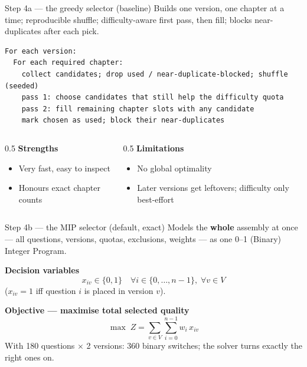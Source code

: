\documentclass[11pt,aspectratio=169]{beamer}
\begin{document}
\begin{frame}[fragile]{Step 4a — the greedy selector (baseline)}
  Builds one version, one chapter at a time; reproducible shuffle; difficulty-aware
  first pass, then fill; blocks near-duplicates after each pick.
\begin{lstlisting}
For each version:
  For each required chapter:
    collect candidates; drop used / near-duplicate-blocked; shuffle (seeded)
    pass 1: choose candidates that still help the difficulty quota
    pass 2: fill remaining chapter slots with any candidate
    mark chosen as used; block their near-duplicates
\end{lstlisting}
  \begin{columns}[T]
    \begin{column}{0.5\textwidth}
      \footnotesize\textbf{Strengths}
      \begin{itemize}
        \item Very fast, easy to inspect
        \item Honours exact chapter counts
      \end{itemize}
    \end{column}
    \begin{column}{0.5\textwidth}
      \footnotesize\textbf{Limitations}
      \begin{itemize}
        \item No global optimality
        \item Later versions get leftovers; difficulty only best-effort
      \end{itemize}
    \end{column}
  \end{columns}
\end{frame}

\begin{frame}{Step 4b — the MIP selector (default, exact)}
  Models the \textbf{whole} assembly at once — all questions, versions, quotas,
  exclusions, weights — as one 0--1 (Binary) Integer Program.

  \vspace{2mm}
  \textbf{Decision variables}
  \[
    x_{iv}\in\{0,1\}\quad\forall i\in\{0,\dots,n-1\},\;\forall v\in V
  \]
  ($x_{iv}=1$ iff question $i$ is placed in version $v$).

  \textbf{Objective — maximise total selected quality}
  \[
    \max\; Z = \sum_{v\in V}\sum_{i=0}^{n-1} w_i\,x_{iv}
  \]
  \footnotesize With 180 questions $\times$ 2 versions: 360 binary switches; the
  solver turns exactly the right ones on.
\end{frame}
\end{document}
